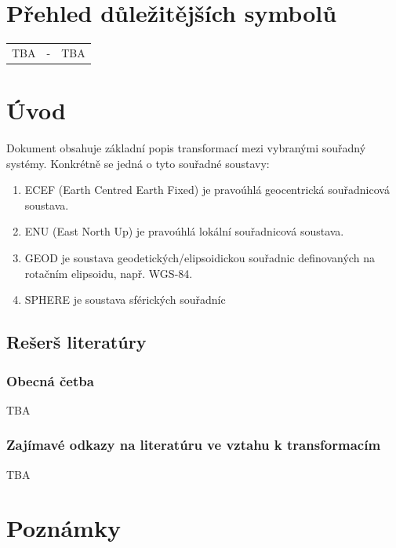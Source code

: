 \documentclass[11pt,a4paper]{article}
\begin{document}
\section*{Přehled důležitějších symbolů}

\begin{table}[ht!]
  \begin{tabular}{c c l}
    TBA  & - & TBA  \\
  \end{tabular}
\end{table}

\section{Úvod}

Dokument obsahuje základní popis transformací mezi vybranými souřadný systémy. Konkrétně se jedná o tyto souřadné soustavy:

\begin{enumerate}
\item ECEF (Earth Centred Earth Fixed) je pravoúhlá geocentrická souřadnicová soustava.
\item ENU (East North Up) je pravoúhlá lokální souřadnicová soustava.
\item GEOD je soustava geodetických/elipsoidickou souřadnic definovaných na rotačním elipsoidu, např. WGS-84.
\item SPHERE je soustava sférických souřadníc
\end{enumerate}

\subsection{Rešerš literatúry}

\subsubsection{Obecná četba}

TBA

\subsubsection{Zajímavé odkazy na literatúru ve vztahu k transformacím}

TBA 

\section{Poznámky}
\end{document}
